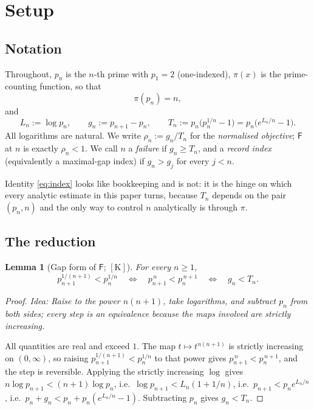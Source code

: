 \documentclass[11pt,a4paper]{article}
\theoremstyle{plain}
\newtheorem{lemma}[theorem]{Lemma}
\theoremstyle{definition}
\theoremstyle{remark}
\newcommand{\idea}[1]{\emph{Idea: #1}\par\smallskip}
\newcommand{\cK}{{[\mathrm{K}]}}
\newcommand{\Fb}{\mathsf{F}}
\begin{document}
\section{Setup}
\label{sec:setup}

\subsection{Notation}

Throughout, $p_n$ is the $n$-th prime with $p_1 = 2$ (one-indexed), $\pi(x)$ is the
prime-counting function, so that
\begin{equation}
\label{eq:index}
\pi(p_n) = n ,
\end{equation}
and
\[
L_n := \log p_n, \qquad g_n := p_{n+1} - p_n, \qquad
T_n := p_n\bigl(p_n^{1/n} - 1\bigr) = p_n\bigl(e^{L_n/n} - 1\bigr).
\]
All logarithms are natural. We write $\rho_n := g_n/T_n$ for the \emph{normalised objective};
$\Fb$ at $n$ is exactly $\rho_n < 1$. We call $n$ a \emph{failure} if $g_n \ge T_n$, and a
\emph{record index} (equivalently a maximal-gap index) if $g_n > g_j$ for every $j < n$.

Identity \eqref{eq:index} looks like bookkeeping and is not: it is the hinge on which every
analytic estimate in this paper turns, because $T_n$ depends on the pair $(p_n, n)$ and the
only way to control $n$ analytically is through $\pi$.

\subsection{The reduction}

\begin{lemma}[Gap form of $\Fb$; $\cK$]
\label{lem:reduction}
For every $n \ge 1$,
\[
p_{n+1}^{1/(n+1)} < p_n^{1/n}
\quad\Longleftrightarrow\quad
p_{n+1}^{\,n} < p_n^{\,n+1}
\quad\Longleftrightarrow\quad
g_n < T_n .
\]
\end{lemma}

\begin{proof}
\idea{Raise to the power $n(n+1)$, take logarithms, and subtract $p_n$ from both sides; every
step is an equivalence because the maps involved are strictly increasing.}
All quantities are real and exceed $1$. The map $t \mapsto t^{n(n+1)}$ is strictly increasing
on $(0,\infty)$, so raising $p_{n+1}^{1/(n+1)} < p_n^{1/n}$ to that power gives
$p_{n+1}^{\,n} < p_n^{\,n+1}$, and the step is reversible. Applying the strictly increasing
$\log$ gives $n \log p_{n+1} < (n+1)\log p_n$, i.e.\ $\log p_{n+1} < L_n(1 + 1/n)$, i.e.\
$p_{n+1} < p_n e^{L_n/n}$, i.e.\ $p_n + g_n < p_n + p_n(e^{L_n/n}-1)$. Subtracting $p_n$
gives $g_n < T_n$.
\end{proof}
\end{document}
